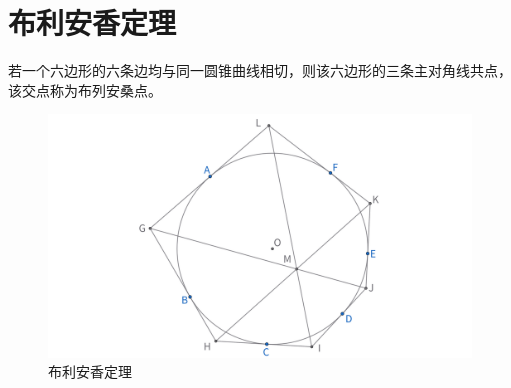 \newpage
\section{布利安香定理}
\begin{theorem}
若一个六边形的六条边均与同一圆锥曲线相切，则该六边形的三条主对角线共点，该交点称为布列安桑点。\end{theorem}
\begin{figure}[H]
    \centering
    \includegraphics[width=\linewidth]{figures/布利安香.png}
    \caption{布利安香定理}
\end{figure}


